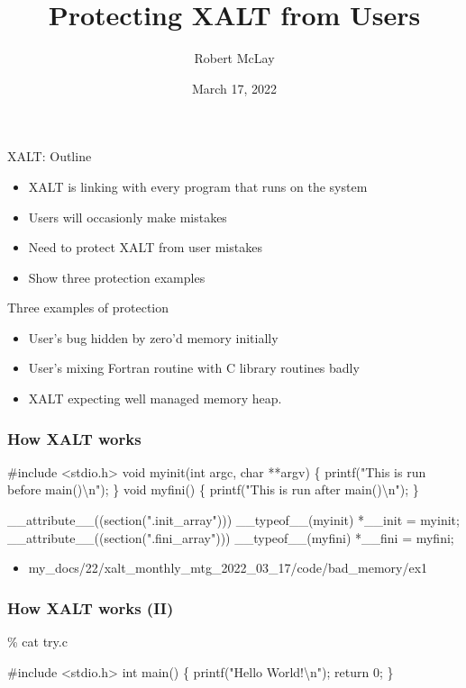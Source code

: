 \documentclass{beamer}
\begin{document}
\title[XALT]{Protecting XALT from Users}
\author{Robert McLay}
\date{March 17, 2022}

\frame{\titlepage}

\begin{frame}{XALT: Outline}
  \begin{itemize}
    \item XALT is linking with every program that runs on the system
    \item Users will occasionly make mistakes
    \item Need to protect XALT from user mistakes
    \item Show three protection examples 
  \end{itemize}
\end{frame}

\begin{frame}{Three examples of protection}
  \begin{itemize}
    \item User's bug hidden by zero'd memory initially
    \item User's mixing Fortran routine with C library routines badly
    \item XALT expecting well managed memory heap.
  \end{itemize}
\end{frame}


\begin{frame}[fragile]
    \frametitle{How XALT works}
 {\tiny
    \begin{semiverbatim}
#include <stdio.h>
void myinit(int argc, char **argv)
\{ printf("This is run before main()\textbackslash{}n"); \}
void myfini()
\{ printf("This is run after main()\textbackslash{}n"); \}

__attribute__((section(".init_array"))) __typeof__(myinit) *__init = myinit;
__attribute__((section(".fini_array"))) __typeof__(myfini) *__fini = myfini;
    \end{semiverbatim}
}
  \begin{itemize}
    \item my\_docs/22/xalt\_monthly\_mtg\_2022\_03\_17/code/bad\_memory/ex1
  \end{itemize}
\end{frame}

\begin{frame}[fragile]
    \frametitle{How XALT works (II)}
 {\small
    \begin{semiverbatim}
\% cat try.c

#include <stdio.h>
int main()
\{
  printf("Hello World!\textbackslash{}n");
  return 0;
\}

    \end{semiverbatim}
}
\end{frame}
\end{document}
